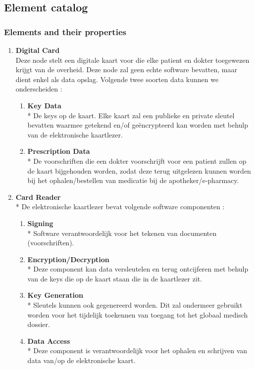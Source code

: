 \documentclass[a4paper,10pt]{article}
\begin{document}
\subsection{Element catalog}

\subsubsection{Elements and their properties}

\begin{enumerate}
 \item \textbf{Digital Card}\\
Deze node stelt een digitale kaart voor die elke patient en dokter toegewezen krijgt van de overheid. Deze node zal geen echte software bevatten, maar dient enkel als data opslag. Volgende twee soorten data kunnen we onderscheiden :
\begin{enumerate}
 \item \textbf{Key Data}\\*
De keys op de kaart. Elke kaart zal een publieke en private sleutel bevatten waarmee getekend en/of geëncrypteerd kan worden met behulp van de elektronische kaartlezer.
\item \textbf{Prescription Data}\\*
De voorschriften die een dokter voorschrijft voor een patient zullen op de kaart bijgehouden worden, zodat deze terug uitgelezen kunnen worden bij het ophalen/bestellen van medicatie bij de apotheker/e-pharmacy.
\end{enumerate}

\item \textbf{Card Reader}\\*
De elektronische kaartlezer bevat volgende software componenten : 
\begin{enumerate}
\item \textbf{Signing}\\*
Software verantwoordelijk voor het tekenen van documenten (voorschriften).
\item \textbf{Encryption/Decryption}\\*
Deze component kan data versleutelen en terug ontcijferen met behulp van de keys die op de kaart staan die in de kaartlezer zit.
\item \textbf{Key Generation}\\*
Sleutels kunnen ook gegenereerd worden. Dit zal ondermeer gebruikt worden voor het tijdelijk toekennen van toegang tot het globaal medisch dossier.
\item \textbf{Data Access}\\*
Deze component is verantwoordelijk voor het ophalen en schrijven van data van/op de elektronische kaart.
\end{enumerate}


\end{enumerate}
\end{document}
